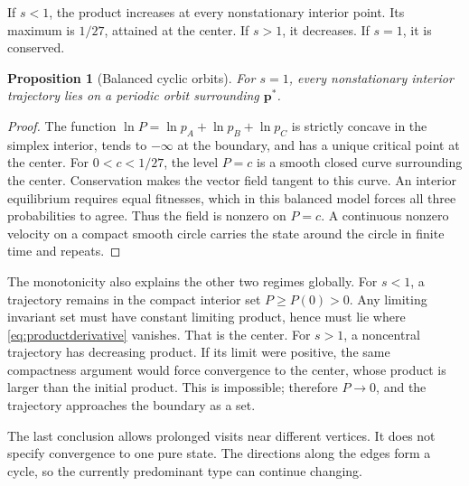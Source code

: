 \documentclass[11pt,oneside,openany]{book}
\newtheorem{proposition}[theorem]{Proposition}
\theoremstyle{definition}
\theoremstyle{remark}
\newcommand{\p}{\mathbf{p}}
\numberwithin{equation}{chapter}
\begin{document}
If $s<1$, the product increases at every nonstationary interior point. Its maximum is $1/27$, attained at the center. If $s>1$, it decreases. If $s=1$, it is conserved.

\begin{proposition}[Balanced cyclic orbits]
For $s=1$, every nonstationary interior trajectory lies on a periodic orbit surrounding $\p^*$.
\end{proposition}
\begin{proof}
The function $\ln P=\ln p_A+\ln p_B+\ln p_C$ is strictly concave in the simplex interior, tends to $-\infty$ at the boundary, and has a unique critical point at the center. For $0<c<1/27$, the level $P=c$ is a smooth closed curve surrounding the center. Conservation makes the vector field tangent to this curve. An interior equilibrium requires equal fitnesses, which in this balanced model forces all three probabilities to agree. Thus the field is nonzero on $P=c$. A continuous nonzero velocity on a compact smooth circle carries the state around the circle in finite time and repeats.
\end{proof}

The monotonicity also explains the other two regimes globally. For $s<1$, a trajectory remains in the compact interior set $P\geq P(0)>0$. Any limiting invariant set must have constant limiting product, hence must lie where \eqref{eq:productderivative} vanishes. That is the center. For $s>1$, a noncentral trajectory has decreasing product. If its limit were positive, the same compactness argument would force convergence to the center, whose product is larger than the initial product. This is impossible; therefore $P\to0$, and the trajectory approaches the boundary as a set.

The last conclusion allows prolonged visits near different vertices. It does not specify convergence to one pure state. The directions along the edges form a cycle, so the currently predominant type can continue changing.
\end{document}
